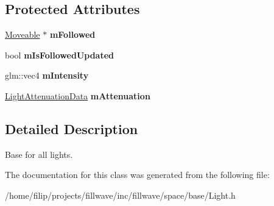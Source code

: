 \subsection*{Protected Attributes}
\begin{DoxyCompactItemize}
\item 
\mbox{\label{classflw_1_1flf_1_1Light_a4f186929fcf2f2de8e22b55c72e68524}} 
\hyperlink{classflw_1_1flf_1_1Moveable}{Moveable} $\ast$ {\bfseries m\+Followed}
\item 
\mbox{\label{classflw_1_1flf_1_1Light_a19d2713688b231ecea3ed8ffefe5d61f}} 
bool {\bfseries m\+Is\+Followed\+Updated}
\item 
\mbox{\label{classflw_1_1flf_1_1Light_a45fd5157caf2cd94b8d2756b776f7232}} 
glm\+::vec4 {\bfseries m\+Intensity}
\item 
\mbox{\label{classflw_1_1flf_1_1Light_a095fa4c4d6b253e829711dc449e7b302}} 
\hyperlink{structflw_1_1flf_1_1LightAttenuationData}{Light\+Attenuation\+Data} {\bfseries m\+Attenuation}
\end{DoxyCompactItemize}


\subsection{Detailed Description}
Base for all lights. 

The documentation for this class was generated from the following file\+:\begin{DoxyCompactItemize}
\item 
/home/filip/projects/fillwave/inc/fillwave/space/base/Light.\+h\end{DoxyCompactItemize}
